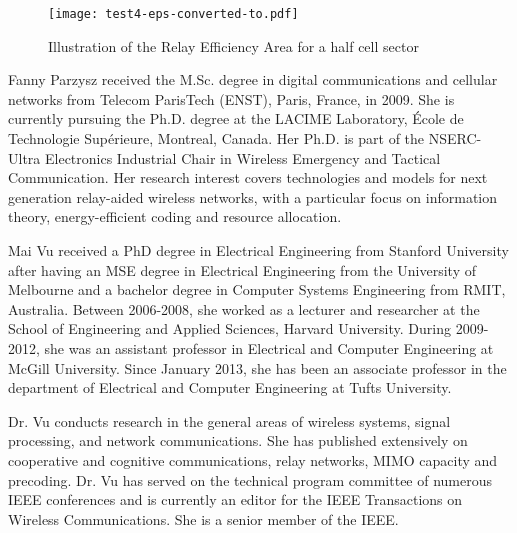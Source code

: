 \documentclass[journal]{IEEEtran}
\theoremstyle{definition}
\begin{document}
\begin{figure}
\centering \texttt{[image: test4-eps-converted-to.pdf]}
\caption{Illustration of the Relay Efficiency Area for a half cell sector} 
\label{fig:Proof_PRTx} 
\end{figure}





{\footnotesize 

}
\fontsize{10}{10}
\selectfont



\begin{IEEEbiography}{Fanny Parzysz}
received the M.Sc. degree in digital communications and cellular networks from Telecom ParisTech (ENST), Paris, France, in 2009. She is currently pursuing the Ph.D. degree at the LACIME Laboratory, \'{E}cole de Technologie Sup\'{e}rieure, Montreal, Canada. Her Ph.D. is part of the NSERC-Ultra Electronics Industrial Chair in Wireless Emergency and Tactical Communication. 
Her research interest covers technologies and models for next generation relay-aided wireless networks, with a particular focus on information theory, energy-efficient coding and resource allocation.
\end{IEEEbiography}
\vfill
\newpage
\begin{IEEEbiography}{Mai Vu}
received a PhD degree in Electrical Engineering from Stanford University after having an MSE degree in Electrical Engineering from the University of Melbourne and a bachelor degree in Computer Systems Engineering from RMIT, Australia. Between 2006-2008, she worked as a lecturer and researcher at the School of Engineering and Applied Sciences, Harvard University. During 2009-2012, she was an assistant professor in Electrical and Computer Engineering at McGill University. Since January 2013, she has been an associate professor in the department of Electrical and Computer Engineering at Tufts University.

Dr. Vu conducts research in the general areas of wireless systems, signal processing, and network communications. She has published extensively on cooperative and cognitive communications, relay networks, MIMO capacity and precoding. Dr. Vu has served on the technical program committee of numerous IEEE conferences and is
currently an editor for the IEEE Transactions on Wireless Communications. She is a senior member of the IEEE.
\end{IEEEbiography}
\end{document}
